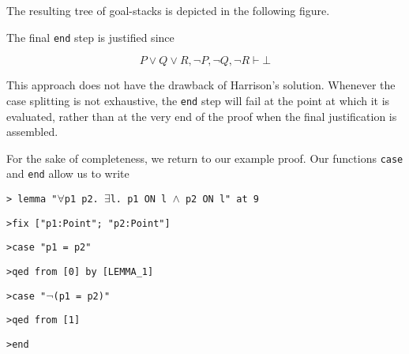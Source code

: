 The resulting tree of goal-stacks is depicted in the following figure.


The final \texttt{end} step is justified since 

\begin{displaymath} 
P \vee Q \vee R, \neg P, \neg Q, \neg R \vdash \bot
\end{displaymath}

This approach does not have the drawback of Harrison's solution. Whenever the case splitting is not exhaustive, the \texttt{end} step will fail at the point at which it is evaluated, rather than at the very end of the proof when the final justification is assembled. 

For the sake of completeness, we return to our example proof. Our functions \texttt{case} and \texttt{end} allow us to write

\vspace{0.5cm}
\begin{minipage}{\linewidth}
  \footnotesize
  \texttt{> lemma "$\forall$p1 p2. $\exists$l. p1 ON l $\wedge$ p2 ON l" at 9}

  \texttt{>\quad fix ["p1:Point"; "p2:Point"]}

  \texttt{>\quad case "p1 = p2" }

  \texttt{>\qquad qed from [0] by [LEMMA\_1] }

  \texttt{>\quad case "$\neg$(p1 = p2)" }

  \texttt{>\qquad qed from [1]}

  \texttt{>\quad end}
\end{minipage}
\vspace{0.5cm}

